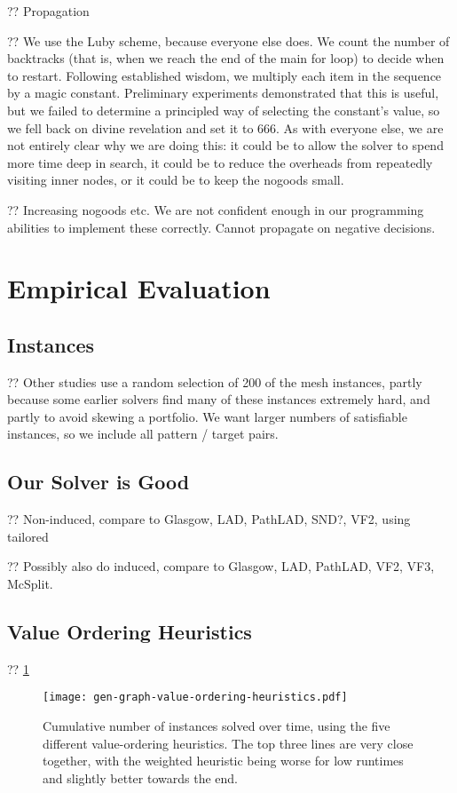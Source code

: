 \documentclass{article}
\begin{document}
?? Propagation

?? We use the Luby scheme, because everyone else does. We count the number of backtracks (that is,
when we reach the end of the main for loop) to decide when to restart. Following established wisdom,
we multiply each item in the sequence by a magic constant. Preliminary experiments demonstrated that
this is useful, but we failed to determine a principled way of selecting the constant's value, so we
fell back on divine revelation and set it to 666. As with everyone else, we are not entirely clear
why we are doing this: it could be to allow the solver to spend more time deep in search, it could
be to reduce the overheads from repeatedly visiting inner nodes, or it could be to keep the nogoods
small.

?? Increasing nogoods etc. We are not confident enough in our programming abilities to implement
these correctly. Cannot propagate on negative decisions.

\section{Empirical Evaluation}

\subsection{Instances}

?? Other studies use a random selection of 200 of the mesh instances, partly because some earlier
solvers find many of these instances extremely hard, and partly to avoid skewing a portfolio. We
want larger numbers of satisfiable instances, so we include all pattern / target pairs.

\subsection{Our Solver is Good}

?? Non-induced, compare to Glasgow, LAD, PathLAD, SND?, VF2, using tailored

?? Possibly also do induced, compare to Glasgow, LAD, PathLAD, VF2, VF3, McSplit.

\subsection{Value Ordering Heuristics}

?? \cref{figure:value-ordering-heuristics}

\begin{figure}[p]
    \centering
    \texttt{[image: gen-graph-value-ordering-heuristics.pdf]}

    \caption{Cumulative number of instances solved over time, using the five different
    value-ordering heuristics. The top three lines are very close together, with the weighted
    heuristic being worse for low runtimes and slightly better towards the end.}
    \label{figure:value-ordering-heuristics}
\end{figure}
\end{document}
